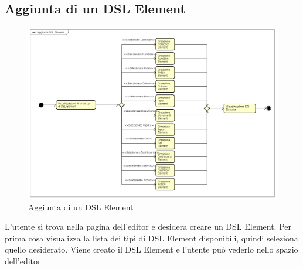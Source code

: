     \subsection{Aggiunta di un DSL Element}
    \begin{figure}[H]
      \centering
      \includegraphics[width=1.0\textwidth]{res/img/aggiuntaDSLElement.png}
      \caption{Aggiunta di un DSL Element}
      \label{fig:diagram_model}
    \end{figure}
    L'utente si trova nella pagina dell'editor e desidera creare un DSL Element. Per prima cosa visualizza la lista dei tipi di DSL Element disponibili, quindi seleziona quello desiderato. Viene creato il DSL Element e l'utente può vederlo nello spazio dell'editor.
